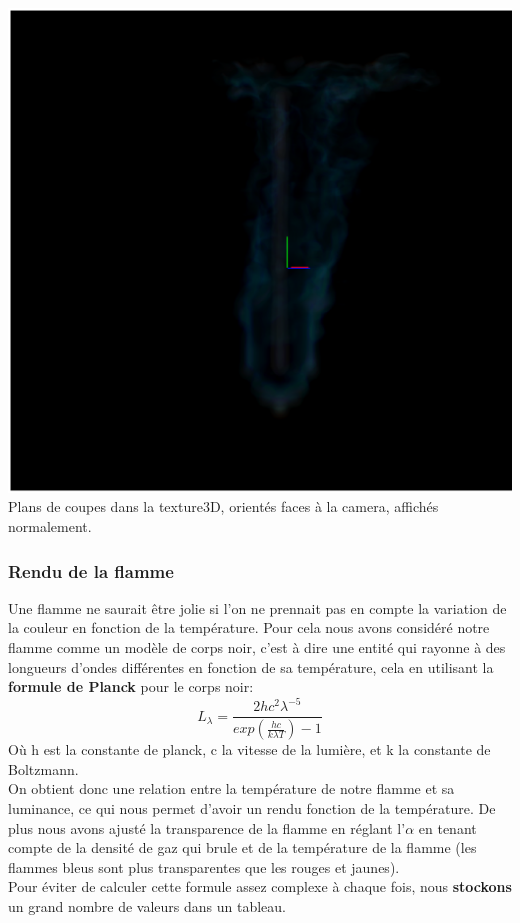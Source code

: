\documentclass[a4paper,10pt]{article}
\begin{document}
\begin{center}
	\includegraphics[scale=0.5]{Render3D3.ps}\\
	Plans de coupes dans la texture3D, orientés faces à la camera, affichés normalement.\\
    \end{center}
    

\subsubsection{Rendu de la flamme}

Une flamme ne saurait être jolie si l'on ne prennait pas en compte la variation de la couleur en fonction de la température. Pour cela nous avons considéré notre flamme comme un modèle de corps noir, c'est à dire une entité qui rayonne à des longueurs d'ondes différentes en fonction de sa température, cela en utilisant la \textbf{formule de Planck} pour le corps noir:\\

\begin{equation}
	L_{\lambda} = \frac{2hc^{2}\lambda^{-5}}{exp(\frac{hc}{k\lambda T})-1}
\end{equation}
Où h est la constante de planck, c la vitesse de la lumière, et k la constante de Boltzmann.\\

On obtient donc une relation entre la température de notre flamme et sa luminance, ce qui nous permet d'avoir un rendu fonction de la température. De plus nous avons ajusté la transparence de la flamme en réglant l'$\alpha$ en tenant compte de la densité de gaz qui brule et de la température de la flamme (les flammes bleus sont plus transparentes que les rouges et jaunes).\\
Pour éviter de calculer cette formule assez complexe à chaque fois, nous \textbf{stockons} un grand nombre de valeurs dans un tableau.
\end{document}
